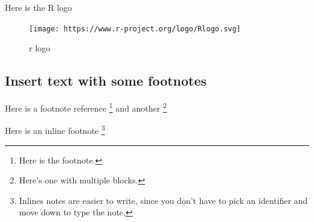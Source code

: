 \documentclass[
]{article}
\begin{document}
Here is the R logo

\begin{figure}
\centering
\texttt{[image: https://www.r-project.org/logo/Rlogo.svg]}
\caption{r logo}
\end{figure}

\hypertarget{insert-text-with-some-footnotes}{%
\subsection{Insert text with some
footnotes}\label{insert-text-with-some-footnotes}}

Here is a footnote reference \footnote{Here is the footnote.} and
another \footnote{Here's one with multiple blocks.}

Here is an inline footnote \footnote{Inlines notes are easier to write,
  since you don't have to pick an identifier and move down to type the
  note.}
\end{document}
